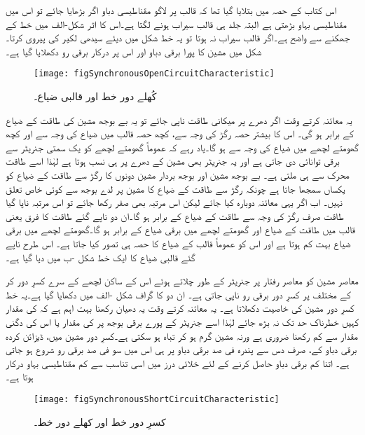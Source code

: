 اس کتاب کے حصہ  میں بتلایا گیا تھا کہ قالب پر لاگو مقناطیسی دباو اگر بڑھایا جائے تو اس میں مقناطیسی بہاو بڑھتی ہے البتہ جلد ہی قالب سیراب ہونے لگتا ہے۔اس کا اثر شکل-الف میں خط کے جھکنے سے واضح ہے۔اگر قالب سیراب نہ ہوتا تو یہ خط شکل میں دیئے سیدھی لکیر کی پیروی کرتا۔شکل میں مشین کا پورا برقی دباو اور اس  پر درکار برقی رو  دکھلایا گیا ہے۔
\begin{figure}
\centering
\texttt{[image: figSynchronousOpenCircuitCharacteristic]}
\caption{کُھلے دور خط اور قالبی ضیاع۔}
\label{شکل_معاصر_کھلے_دور_خط}
\end{figure}

یہ معائنہ کرتے وقت اگر دھرے پر میکانی طاقت  ناپی جائے تو یہ بے بوجھ مشین کی طاقت کے ضیاع کے برابر ہو گی۔ اس کا بیشتر حصہ رگڑ کی وجہ سے، کچھ حصہ قالب میں ضیاع کی وجہ سے اور کچھ گھومتے لچھے میں ضیاع کی وجہ سے ہو گا۔یاد رہے کہ عموماً گھومتے لچھے کو یک سمتی جنریٹر سے برقی توانائی دی جاتی ہے اور یہ جنریٹر بھی مشین کے دھرے پر ہی نسب ہوتا ہے لہٰذا اسے طاقت محرک سے ہی ملتی ہے۔ بے بوجھ مشین اور بوجھ بردار مشین دونوں کا رگڑ سے طاقت کے ضیاع کو یکساں سمجھا جاتا ہے چونکہ رگڑ سے طاقت کے ضیاع کا مشین پر لدے بوجھ سے کوئی خاص تعلق نہیں۔ اب اگر یہی معائنہ دوبارہ کیا جائے لیکن اس مرتبہ  بھی صفر رکھا جائے تو اس مرتبہ ناپا گیا طاقت  صرف رگڑ کی وجہ سے طاقت کے ضیاع کے برابر ہو گا۔ان دو ناپے گئے طاقت کا فرق یعنی  قالب میں طاقت کے ضیاع  اور گھومتے لچھے میں برقی ضیاع کے برابر ہو گا۔گھومتے لچھے میں برقی ضیاع بہت کم ہوتا ہے اور اس کو عموماً قالب کے ضیاع کا حصہ ہی تصور کیا جاتا ہے۔ اس طرح ناپے گئے قالبی ضیاع کا ایک خط شکل  -ب میں دیا گیا ہے۔

معاصر مشین کو معاصر رفتار پر جنریٹر کے طور چلاتے ہوئے اس کے ساکن لچھے کے سرے کسرِ دور کر کے مختلف  پر کسرِ دور برقی رو  ناپی جاتی ہے۔ ان دو کا گراف شکل -الف میں دکھایا گیا ہے۔یہ خط کسرِ دور مشین کی خاصیت دکھلاتا ہے۔  یہ معائنہ کرتے وقت یہ دھیان رکھنا بہت اہم ہے کہ  کی مقدار کہیں خطرناک حد تک نہ بڑھ جائے لہٰذا اسے جنریٹر کے پورے برقی بوجھ پر  کی مقدار  یا اس کی دگنی مقدار سے کم رکھنا ضروری ہے ورنہ مشین گرم ہو کر تباہ ہو سکتی ہے۔کسرِ دور مشین میں، ڈیزائن کردہ برقی دباو کے، صرف دس سے پندرہ فی صد برقی دباو پر ہی اس میں سو فی صد برقی رو شروع ہو جاتی ہے۔ اتنا کم برقی دباو حاصل کرنے کے لئے خلائی درز میں اسی تناسب سے  کم مقناطیسی بہاو درکار ہوتا ہے۔ 
\begin{figure}
\centering
\texttt{[image: figSynchronousShortCircuitCharacteristic]}
\caption{کسرِ دور خط اور کھلے دور خط۔}
\label{شکل_معاصر_کسر_دور_اور_کھلے_دور_خط}
\end{figure}

